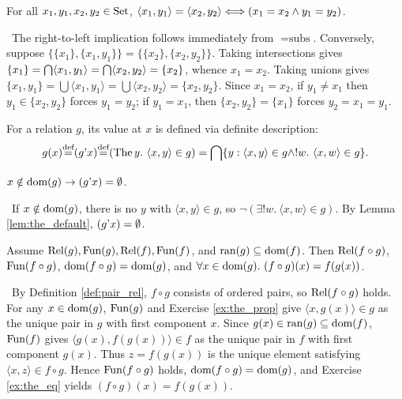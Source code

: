 \documentclass[10pt,a4paper]{article}
\begin{document}
\begin{lemma}\label{lem:pair_prop}
For all $x_1, y_1, x_2, y_2 \in {\textrm{Set}}$, $\langle x_1, y_1 \rangle = \langle x_2, y_2 \rangle \Longleftrightarrow (x_1 = x_2 \land y_1 = y_2)$.
\end{lemma}
\myprf\ The right-to-left implication follows immediately from $=\textrm{subs}$. Conversely, suppose $\{\{x_1\}, \{x_1, y_1\}\} = \{\{x_2\}, \{x_2, y_2\}\}$. Taking intersections gives $\{x_1\} = {\bigcap} \langle x_1, y_1 \rangle = {\bigcap} \langle x_2, y_2 \rangle = \{x_2\}$, whence $x_1 = x_2$. Taking unions gives $\{x_1, y_1\} = \bigcup \langle x_1, y_1 \rangle = \bigcup \langle x_2, y_2 \rangle = \{x_2, y_2\}$. Since $x_1 = x_2$, if $y_1 \neq x_1$ then $y_1 \in \{x_2, y_2\}$ forces $y_1 = y_2$; if $y_1 = x_1$, then $\{x_2, y_2\} = \{x_1\}$ forces $y_2 = x_1 = y_1$. \myqed

For a relation $g$, its value at $x$ is defined via definite description:
$$g(x) {\stackrel{{\textrm{def}}}{=}} (g{\textrm{'}} x) {\stackrel{{\textrm{def}}}{=}} ({\textrm{The\,}} y.\ \langle x, y\rangle \in g) = {\bigcap} \{y : \langle x,y\rangle \in g \land !w.\ \langle x,w\rangle \in g\}.$$

\begin{exercise}
$x\notin {\textrm{dom}}(g)\to (g{\textrm{'}} x)=\emptyset$.
\end{exercise}
\myprf\ If $x \notin {\textrm{dom}}(g)$, there is no $y$ with $\langle x,y\rangle \in g$, so $\neg(\exists !w.\ \langle x,w\rangle \in g)$. By Lemma \ref{lem:the_default}, $(g{\textrm{'}} x) = \emptyset$. \myqed

\begin{lemma}\label{lem:fun_comp}
Assume ${\textrm{Rel}}(g), {\textrm{Fun}}(g), {\textrm{Rel}}(f), {\textrm{Fun}}(f)$, and $\textrm{ran}(g) \subseteq {\textrm{dom}}(f)$. Then ${\textrm{Rel}}(f \circ g)$, ${\textrm{Fun}}(f \circ g)$, ${\textrm{dom}}(f \circ g) = {\textrm{dom}}(g)$, and $\forall x \in {\textrm{dom}}(g).\ (f \circ g)(x) = f(g(x))$.
\end{lemma}
\myprf\ By Definition \ref{def:pair_rel}, $f \circ g$ consists of ordered pairs, so ${\textrm{Rel}}(f \circ g)$ holds. For any $x \in {\textrm{dom}}(g)$, ${\textrm{Fun}}(g)$ and Exercise \ref{ex:the_prop} give $\langle x, g(x) \rangle \in g$ as the unique pair in $g$ with first component $x$. Since $g(x) \in \textrm{ran}(g) \subseteq {\textrm{dom}}(f)$, ${\textrm{Fun}}(f)$ gives $\langle g(x), f(g(x)) \rangle \in f$ as the unique pair in $f$ with first component $g(x)$. Thus $z = f(g(x))$ is the unique element satisfying $\langle x, z \rangle \in f \circ g$. Hence ${\textrm{Fun}}(f \circ g)$ holds, ${\textrm{dom}}(f \circ g) = {\textrm{dom}}(g)$, and Exercise \ref{ex:the_eq} yields $(f \circ g)(x) = f(g(x))$. \myqed
\end{document}
